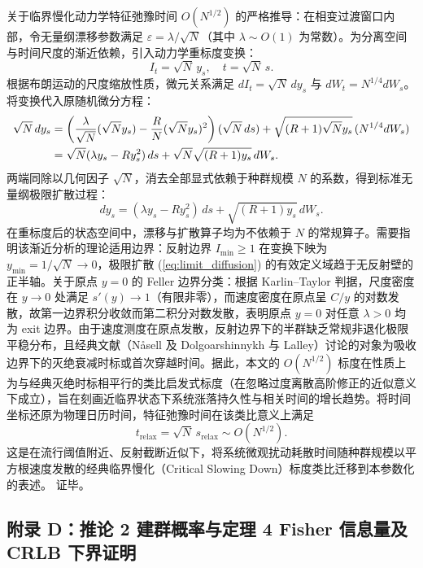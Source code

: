 \documentclass[11pt,a4paper]{article}
\theoremstyle{plain}
\theoremstyle{definition}
\begin{document}
关于临界慢化动力学特征弛豫时间 $O(N^{1/2})$ 的严格推导：在相变过渡窗口内部，令无量纲漂移参数满足 $\varepsilon = \lambda / \sqrt{N}$（其中 $\lambda \sim O(1)$ 为常数）。为分离空间与时间尺度的渐近依赖，引入动力学重标度变换：
\begin{equation}
I_t = \sqrt{N}\, y_s, \quad t = \sqrt{N}\, s.
\end{equation}
根据布朗运动的尺度缩放性质，微元关系满足 $dI_t = \sqrt{N}\, dy_s$ 与 $dW_t = N^{1/4} dW_s$。将变换代入原随机微分方程：
\begin{align}
\sqrt{N}\, dy_s &= \left( \frac{\lambda}{\sqrt{N}} (\sqrt{N} y_s) - \frac{R}{N} (\sqrt{N} y_s)^2 \right) (\sqrt{N}\, ds) + \sqrt{(R+1)\sqrt{N} y_s}\, (N^{1/4} dW_s) \notag \\
&= \sqrt{N} (\lambda y_s - R y_s^2)\, ds + \sqrt{N} \sqrt{(R+1)y_s}\, dW_s.
\end{align}
两端同除以几何因子 $\sqrt{N}$，消去全部显式依赖于种群规模 $N$ 的系数，得到标准无量纲极限扩散过程：
\begin{equation}
dy_s = (\lambda y_s - R y_s^2)\, ds + \sqrt{(R+1)y_s}\, dW_s.
\label{eq:limit_diffusion}
\end{equation}
在重标度后的状态空间中，漂移与扩散算子均为不依赖于 $N$ 的常规算子。需要指明该渐近分析的理论适用边界：反射边界 $I_{\min} \ge 1$ 在变换下映为 $y_{\min} = 1/\sqrt{N} \to 0$，极限扩散 (\ref{eq:limit_diffusion}) 的有效定义域趋于无反射壁的正半轴。关于原点 $y=0$ 的 Feller 边界分类：根据 Karlin--Taylor 判据，尺度密度在 $y \to 0$ 处满足 $s'(y) \to 1$（有限非零），而速度密度在原点呈 $C/y$ 的对数发散，故第一边界积分收敛而第二积分对数发散，表明原点 $y=0$ 对任意 $\lambda > 0$ 均为 exit 边界。由于速度测度在原点发散，反射边界下的半群缺乏常规非退化极限平稳分布，且经典文献（N{\aa}sell\citep{nasell1999quasi} 及 Dolgoarshinnykh 与 Lalley\citep{dolgoarshinnykh2006critical}）讨论的对象为吸收边界下的灭绝衰减时标或首次穿越时间。据此，本文的 $O(N^{1/2})$ 标度在性质上为与经典灭绝时标相平行的类比启发式标度（在忽略过度离散高阶修正的近似意义下成立），旨在刻画近临界状态下系统涨落持久性与相关时间的增长趋势。将时间坐标还原为物理日历时间，特征弛豫时间在该类比意义上满足
\begin{equation}
t_{\text{relax}} = \sqrt{N}\, s_{\text{relax}} \sim O(N^{1/2}).
\end{equation}
这是在流行阈值附近、反射截断近似下，将系统微观扰动耗散时间随种群规模以平方根速度发散的经典临界慢化（Critical Slowing Down）标度类比迁移到本参数化的表述。
证毕。

\subsection*{附录 D：推论 2 建群概率与定理 4 Fisher 信息量及 CRLB 下界证明}
\end{document}
